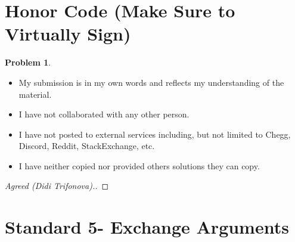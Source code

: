 \documentclass[11pt]{article}
\theoremstyle{definition}
\theoremstyle{definition}
\newtheorem{required}{Problem}
\theoremstyle{definition}
\begin{document}
\section{Honor Code (Make Sure to Virtually Sign)} \label{HonorCode}

\begin{required}
\noindent 
\begin{itemize}
\item My submission is in my own words and reflects my understanding of the material.
\item I have not collaborated with any other person.
\item I have not posted to external services including, but not limited to Chegg, Discord, Reddit, StackExchange, etc.
\item I have neither copied nor provided others solutions they can copy.
\end{itemize}

\end{required}

\begin{proof}[Agreed (Didi Trifonova).]
\end{proof}



\newpage
\section{Standard 5- Exchange Arguments}
\end{document}
